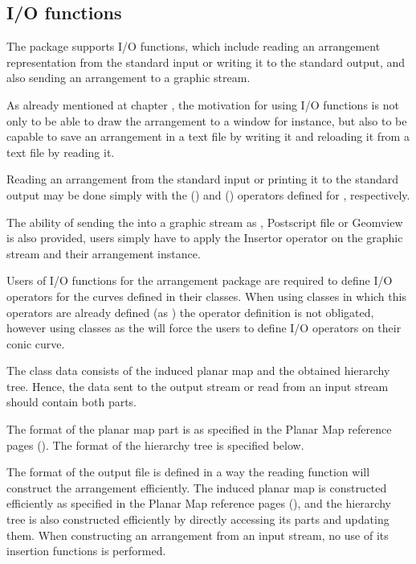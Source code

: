 \begin{ccAdvanced}
\subsection{I/O functions}
The  package supports I/O functions, which include reading 
an arrangement representation from 
the standard input or writing it to the standard output, 
and also sending an arrangement to a graphic stream.

As already mentioned at chapter , the motivation for 
using I/O functions is not only to be able to draw the arrangement 
to a window for instance, but also to be capable to save an arrangement 
in a text file by writing it and reloading it from a text file by reading it. 
 
Reading an arrangement from the standard input or printing it to the
standard output may be done simply with the  (\ccc{ >>
}) and  (\ccc{ << }) operators defined for
, respectively. 


The ability of sending the  
into a graphic stream as , Postscript file or
Geomview is also provided, users simply have to apply the Insertor
operator on the graphic stream and their arrangement instance.

Users of I/O functions for the arrangement package are required to define I/O 
operators for the curves defined in their  classes. 
When using  classes in which this operators are already defined 
(as ) the operator definition is not obligated, 
however using  classes as the  will force 
the users to define I/O operators on their conic curve.

The  class data consists of the induced planar map and the 
obtained hierarchy tree. Hence, the data sent to the output stream or 
read from an input stream should contain both parts. 

The format of the planar map part is as specified in the Planar Map 
reference pages (). 
The format of the hierarchy tree is specified below.

The format of the output file is defined in a way the reading function 
will construct the arrangement efficiently. 
The induced planar map is constructed efficiently as specified in the Planar 
Map reference pages (), and the hierarchy tree is also 
constructed efficiently by directly accessing its parts and updating them. 
When constructing an arrangement from an input stream, no use of its 
insertion functions is performed.
 

\end{ccAdvanced}
